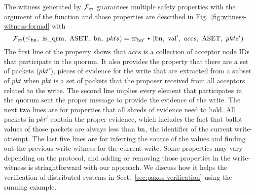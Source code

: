 The witness generated by $\mathcal{F}_{\varpi}$ guarantees multiple safety properties with the argument of the function and those properties are described in Fig.~\ref{fig:witness-witness-formal}
with
$$\funwitness(\le_{\ballotnum},~\isquorums,~\accsset,~\ballotnum,~pkts) = \witness_{\ballotnum'} \ \cons \ (\ballotnum,~\dsvalue',~accs,~\accsset,~pkts')$$ The first line of the property shows that
$accs$ is a collection of acceptor node IDs that participate in the quorum.
It also provides the property that there are a set of packets ($pkt'$), pieces of evidence for the write that are extracted from a subset of $pkt$ when $pkt$ is a set of packets that the proposer received from all acceptors related to the write. 
The second line implies every element that participates in the quorum sent the proper message to provide the evidence of the write.
The next two lines are for properties that all shreds of evidence need to hold. 
All packets in $pkt'$ contain the proper evidence, which includes the fact that ballot values of those packets are always less than $\mathrm{bn}$, the identifier of the current write-attempt.
The last five lines are for inferring the source of the values and finding out the previous write-witness for the current write.
Some properties may vary depending on the protocol, and adding or removing those properties in the write-witness is striaghtforward with our approach. We discuss how it helps the verification of distributed systems in Sect.~\ref{sec:paxos-verification} using the running example.
